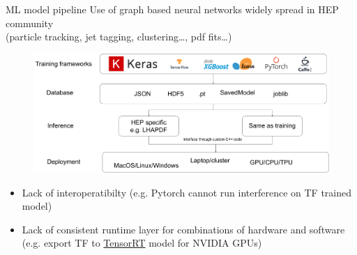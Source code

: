 \documentclass[aspectratio=169,9pt]{beamer}
\begin{document}
\begin{frame}[t]{ML model pipeline}
  Use of graph based neural networks widely spread in HEP community \\
  (particle tracking, jet tagging, clustering\ldots, pdf fits\ldots)\\\vspace*{0.5cm}
  \begin{figure}
    \centering
    \includegraphics[width=.6\textwidth]{ml_models.pdf}
  \end{figure}
  \begin{itemize}
    \item Lack of interoperatibilty (e.g. Pytorch cannot run interference on TF trained model)
    \item Lack of consistent runtime layer for combinations of hardware and software \\ (e.g. export TF to \href{https://developer.nvidia.com/tensorrt?utm_source=thenewstack&utm_medium=website&utm_campaign=platform}{\color{blue}TensorRT} model for NVIDIA GPUs)
  \end{itemize}
\end{frame}
\end{document}
